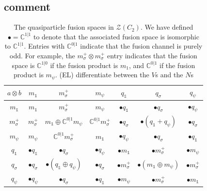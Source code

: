 \documentclass[12pt,a4paper]{article}
\newcommand{\tp}{\otimes}
\newcommand{\unit}{\mathds{1}}
\newcommand{\cc}{\mathbb{C}}
\newcommand{\mcz}{\mathcal{Z}}
\newcommand{\ethan}[1]{{\color{amethyst}\footnotesize{(EL) #1}}}
\begin{document}
\subsection{comment}
\begin{table}
\centering
\begin{tabular}{c||c|c|c||c|c|c}
$ {a\otimes b} $&$m_\unit $&$m_\sigma^+$&$m_\psi$&$q_\unit$&$q_\sigma$&$q_\psi $\\
     \hline
     \hline
     
$m_\unit $&$m_\unit$&$ m_\sigma^+$&$m_\psi$&    $\bullet q_\unit$&$\bullet q_\sigma$&$\bullet q_\psi$ \\

     \hline
$m_\sigma^+ $&$m_\sigma^+$&$m_\unit \oplus \cc^{0|1}m_\psi $&$ \cc^{0|1} m_\sigma^+ $&$      \bullet q_\sigma $&$ \bullet (q_\unit + q_\psi)$&$ \bullet q_\sigma$ \\

     \hline
     
$m_\psi $&$m_\psi$&$\cc^{0|1} m_\sigma^+$&$m_\unit$&      $\bullet q_\psi$&$\bullet q_\sigma$&$\bullet q_\unit $\\

     \hline
     \hline
     
$q_\unit $&$\bullet q_\unit$&$\bullet q_\sigma $&$\bullet q_\psi$&$\bullet m_\unit$&$\bullet m_\sigma^+$&$\bullet m_\psi$\\

\hline
$q_\sigma$&$\bullet q_\sigma$&$\bullet (q_\unit \oplus q_\psi)$&$\bullet q_\sigma$&$\bullet m_\sigma^+$&$\bullet (m_\unit \oplus m_\psi)$&$\bullet m_\sigma^+$ \\

\hline
$q_\psi $&$\bullet q_\psi$&$\bullet q_\sigma$&$\bullet q_\unit$&$\bullet m_\psi$&$\bullet m_\sigma^+$&$\bullet m_\unit$
\end{tabular}
\caption{ \label{fusiontable} The quasiparticle fusion spaces in $\mcz(C_2)$. 
We have defined $\bullet = \mathbb{C}^{1|1}$ to denote that the associated fusion space is isomorphic to $\cc^{1|1}$.
Entries with $\cc^{0|1}$ indicate that the fusion channel is purely odd. 
For example, the $m_\sigma^+ \tp m_\sigma^+$ entry indicates that the fusion space is $\cc^{1|0}$ if the fusion product is $m_1$, and $\cc^{0|1}$ if the fusion product is $m_\psi$. \ethan{differentiate between the $V$s and the $N$s }}
\end{table}
 
 
\end{document}
